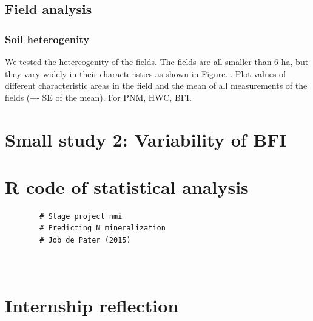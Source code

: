 \documentclass[10pt,twoside,dutch,english]{report}
\begin{document}
\begin{appendices}
			\section{Field analysis}
		
			\subsection{Soil heterogenity}
			We tested the hetereogenity of the fields. The fields are all smaller than 6 ha, but they vary widely in their characteristics as shown in Figure...
			Plot values of different characteristic areas in the field and the mean of all measurements of the fields (+- SE of the mean). For PNM, HWC, BFI.
			
\chapter{Small study 2: Variability of BFI}
		\label{chap:study2}
		
		
		\chapter{R code of statistical analysis} %
		\begin{verbatim}
		# Stage project nmi
		# Predicting N mineralization
		# Job de Pater (2015)
		
		
		\end{verbatim}
\chapter{Internship reflection}

\end{appendices}



    
\end{document}

